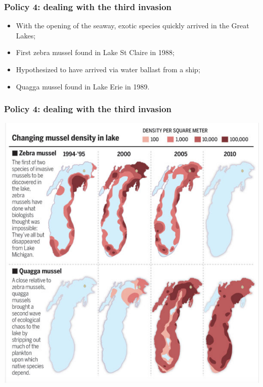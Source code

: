 \documentclass[aspectratio=169]{beamer}
\theoremstyle{principle}
\begin{document}
\begin{frame}
\frametitle{Policy 4: dealing with the third invasion}

\begin{itemize}
\item With the opening of the seaway, exotic species quickly arrived in the Great Lakes;
\bigskip
\bigskip
\item First zebra mussel found in Lake St Claire in 1988;
\bigskip
\bigskip
\item Hypothesized to have arrived via water ballast from a ship;
\bigskip
\bigskip
\item Quagga mussel found in Lake Erie in 1989.
\end{itemize}

\end{frame}

\begin{frame}
\frametitle{Policy 4: dealing with the third invasion}

    \begin{center}
    \includegraphics[scale=0.35]{quaggas_and_zebs.png}
     \end{center}

\end{frame}
\end{document}
